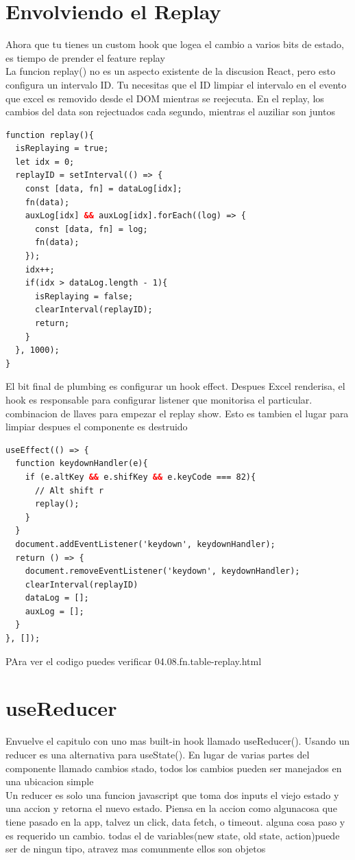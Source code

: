 \section{Envolviendo el Replay}
Ahora que tu tienes un custom hook que logea el cambio a varios bits de estado, es tiempo de prender el feature replay\\
La funcion replay() no es un aspecto existente de la discusion React, pero esto configura un intervalo ID. Tu necesitas que el ID limpiar el intervalo en el evento que excel es removido desde el DOM mientras se reejecuta. En el replay, los cambios del data son rejectuados cada segundo, mientras el auziliar son juntos
\begin{lstlisting}[language=html]
function replay(){
  isReplaying = true;
  let idx = 0;
  replayID = setInterval(() => {
    const [data, fn] = dataLog[idx];
    fn(data);
    auxLog[idx] && auxLog[idx].forEach((log) => {
      const [data, fn] = log;
      fn(data);
    });
    idx++;
    if(idx > dataLog.length - 1){
      isReplaying = false;
      clearInterval(replayID);
      return;
    }
  }, 1000);
}
\end{lstlisting}
El bit final de plumbing es configurar un hook effect. Despues Excel renderisa, el hook es responsable para configurar listener que monitorisa el particular. combinacion de llaves para empezar el replay show. Esto es tambien el lugar para limpiar despues el componente es destruido
\begin{lstlisting}[language=html]
useEffect(() => {
  function keydownHandler(e){
    if (e.altKey && e.shifKey && e.keyCode === 82){
      // Alt shift r
      replay();
    }
  }
  document.addEventListener('keydown', keydownHandler);
  return () => {
    document.removeEventListener('keydown', keydownHandler);
    clearInterval(replayID)
    dataLog = [];
    auxLog = [];
  }
}, []);
\end{lstlisting}
PAra ver el codigo puedes verificar 04.08.fn.table-replay.html
\section{useReducer}
Envuelve el capitulo con uno mas built-in hook llamado useReducer(). Usando un reducer es una alternativa para useState(). En lugar de varias partes del componente llamado cambios stado, todos los cambios pueden ser manejados en una ubicacion simple\\
Un reducer es solo una funcion javascript que toma dos inputs el viejo estado y una accion y retorna el nuevo estado. Piensa en la accion como algunacosa que tiene pasado en la app, talvez un click, data fetch, o timeout. alguna cosa paso y es requerido un cambio. todas el de variables(new state, old state, action)puede ser de ningun tipo, atravez mas comunmente ellos son objetos
